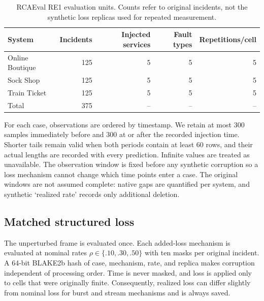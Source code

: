 \documentclass[runningheads]{llncs}
\begin{document}
\begin{table}[t]
\caption{RCAEval RE1 evaluation units. Counts refer to original incidents, not
the synthetic loss replicas used for repeated measurement.}
\label{tab:data}
\centering
\begin{tabular}{lrrrr}
\toprule
System & Incidents & Injected services & Fault types & Repetitions/cell\\
\midrule
Online Boutique & 125 & 5 & 5 & 5\\
Sock Shop & 125 & 5 & 5 & 5\\
Train Ticket & 125 & 5 & 5 & 5\\
\midrule
Total & 375 & -- & -- & --\\
\bottomrule
\end{tabular}
\end{table}

For each case, observations are ordered by timestamp. We retain at most 300
samples immediately before and 300 at or after the recorded injection time.
Shorter tails remain valid when both periods contain at least 60 rows, and
their actual lengths are recorded with every prediction. Infinite values are
treated as unavailable. The observation window is fixed before any synthetic
corruption so a loss mechanism cannot change which time points enter a case.
The original windows are not assumed complete: native gaps are quantified per
system, and synthetic `realized rate' records only additional deletion.

\subsection{Matched structured loss}

The unperturbed frame is evaluated once. Each added-loss mechanism is evaluated at
nominal rates $\rho\in\{.10,.30,.50\}$ with ten masks per original incident.
A 64-bit BLAKE2b hash of case, mechanism, rate, and replica makes corruption
independent of processing order. Time is never masked, and loss is applied only
to cells that were originally finite. Consequently, realized loss can differ
slightly from nominal loss for burst and stream mechanisms and is always saved.
\end{document}
